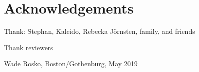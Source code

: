 
\thispagestyle{plain}			%
\section*{Acknowledgements}
Thank: Stephan, Kaleido, Rebecka Jörnsten, family, and friends

\medskip
Thank reviewers

\vspace{1.5cm}
\hfill
Wade Rosko, Boston/Gothenburg, May 2019

\newpage				%
\thispagestyle{empty}
\mbox{}